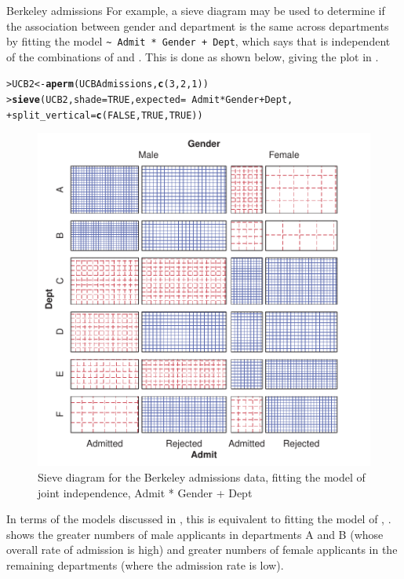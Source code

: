 \documentclass[10pt,krantz2]{krantz}\usepackage[]{graphicx}\usepackage[]{color}
\makeatletter
\newcommand{\hlnum}[1]{\textcolor[rgb]{0.686,0.059,0.569}{#1}}%
\newcommand{\hlopt}[1]{\textcolor[rgb]{0,0,0}{#1}}%
\newcommand{\hlstd}[1]{\textcolor[rgb]{0.345,0.345,0.345}{#1}}%
\newcommand{\hlkwb}[1]{\textcolor[rgb]{0.69,0.353,0.396}{#1}}%
\newcommand{\hlkwc}[1]{\textcolor[rgb]{0.333,0.667,0.333}{#1}}%
\newcommand{\hlkwd}[1]{\textcolor[rgb]{0.737,0.353,0.396}{\textbf{#1}}}%
\newenvironment{kframe}{%
 \def\at@end@of@kframe{}%
 \ifinner\ifhmode%
  \def\at@end@of@kframe{\end{minipage}}%
  \begin{minipage}{\columnwidth}%
 \fi\fi%
 \def\FrameCommand##1{\hskip\@totalleftmargin \hskip-\fboxsep
 \colorbox{shadecolor}{##1}\hskip-\fboxsep
     \hskip-\linewidth \hskip-\@totalleftmargin \hskip\columnwidth}%
 \MakeFramed {\advance\hsize-\width
   \@totalleftmargin\z@ \linewidth\hsize
   \@setminipage}}%
 {\par\unskip\endMakeFramed%
 \at@end@of@kframe}
\newenvironment{knitrout}{}{} %
\renewenvironment{knitrout}{\small\renewcommand{\baselinestretch}{.85}}{} %
\makeatother
\begin{document}
\begin{Example}[berkeley3]{Berkeley admissions}
For example, a sieve diagram may be used to determine if the association
between gender and department is the same across departments
by fitting the model \verb|~ Admit * Gender + Dept|, which
says that  is independent of the combinations of 
and .  This is done as shown below, giving the plot in
.

\begin{knitrout}
\color{fgcolor}\begin{kframe}
\begin{alltt}
\hlstd{> }\hlstd{UCB2} \hlkwb{<-} \hlkwd{aperm}\hlstd{(UCBAdmissions,} \hlkwd{c}\hlstd{(}\hlnum{3}\hlstd{,} \hlnum{2}\hlstd{,} \hlnum{1}\hlstd{))}
\hlstd{> }\hlkwd{sieve}\hlstd{(UCB2,} \hlkwc{shade} \hlstd{=} \hlnum{TRUE}\hlstd{,} \hlkwc{expected} \hlstd{=} \hlopt{~} \hlstd{Admit} \hlopt{*} \hlstd{Gender} \hlopt{+} \hlstd{Dept,}
\hlstd{+ }      \hlkwc{split_vertical} \hlstd{=} \hlkwd{c}\hlstd{(}\hlnum{FALSE}\hlstd{,} \hlnum{TRUE}\hlstd{,} \hlnum{TRUE}\hlstd{))}
\end{alltt}
\end{kframe}\begin{figure}[!htbp]

\centerline{\includegraphics[width=.6\textwidth]{ch04/fig/berkeley-sieve2-1} }

\caption[Sieve diagram for the Berkeley admissions data, fitting the model of joint independence, Admit * Gender + Dept]{Sieve diagram for the Berkeley admissions data, fitting the model of joint independence, Admit * Gender + Dept}\label{fig:berkeley-sieve2}
\end{figure}


\end{knitrout}
In terms of the \loglin models discussed in
, this is equivalent to fitting the model
of , .
 shows the greater numbers of
male applicants in departments A and B
(whose overall rate of admission is high) and greater numbers of female
applicants in the remaining departments (where the admission rate is low).

\end{Example}
\end{document}
